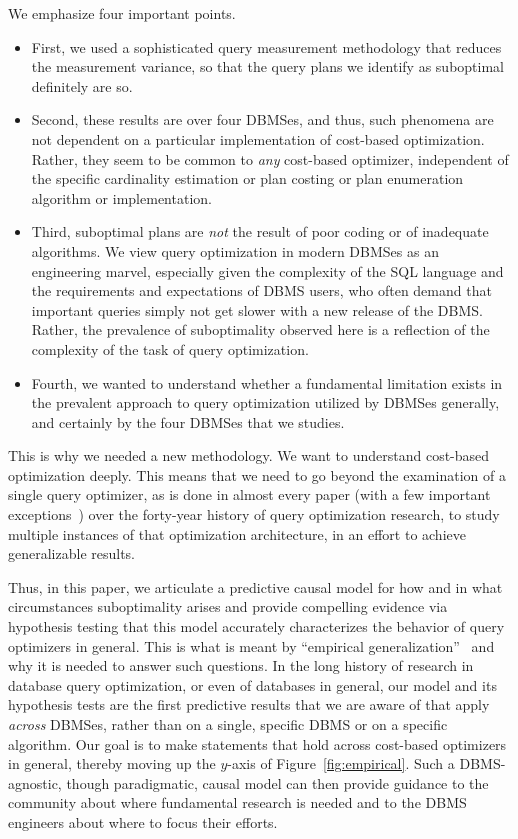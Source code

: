 \documentclass[prodmode,acmtods]{acmsmall}
\begin{document}
We emphasize four important points.
\begin{itemize}
\item First, we used a sophisticated query
measurement methodology that reduces the measurement variance, so that the
query plans we identify as suboptimal definitely are so.
\item Second, these
results are over four \hbox{DBMSes}, and thus, such phenomena are not dependent on
a particular implementation of cost-based optimization. Rather, they seem to
be common to {\em any} cost-based optimizer, independent of the specific
cardinality \hbox{estimation} or plan costing or plan enumeration algorithm or
implementation.
\item Third, suboptimal plans are {\em not} the result of poor
coding or of inadequate algorithms. We view query optimization in modern
\hbox{DBMSes} as an engineering marvel, especially given the complexity of the SQL
language and the requirements and expectations of \hbox{DBMS} users, who often
demand that important queries simply not get slower with a new release of
the \hbox{DBMS}. Rather, the prevalence of suboptimality observed here is a
reflection of the complexity of the task of query optimization.
\item Fourth, we wanted to understand whether a fundamental
limitation exists in the prevalent approach to query optimization utilized
by DBMSes generally, and certainly by the four DBMSes that we studies.
\end{itemize}

This is why we needed a new methodology. We want to understand cost-based
optimization deeply. This means that we need to go beyond the examination of
a single query optimizer, as is done in almost every paper (with a few
important exceptions~\cite{harish07,Haritsa10,Leis15}) over the forty-year history of
query optimization research, to study multiple instances of that
optimization architecture, in an effort to achieve generalizable results.

Thus, in this paper, we articulate a predictive causal model for how and in
what circumstances suboptimality arises and provide compelling evidence via
\hbox{hypothesis} testing that this model accurately characterizes the
\hbox{behavior} of query optimizers in general. This is what is meant by
``empirical generalization''~\cite{cohenbook} and why it is needed to answer
such questions. In the long history of research in database query
optimization, or even of databases in general, our model and its hypothesis
tests are the first predictive results that we are aware of that apply {\em
  across} \hbox{DBMSes}, rather than on a single, specific \hbox{DBMS} or on
a specific algorithm. Our goal is to make statements
that hold across cost-based optimizers in general, thereby moving up the
$y$-axis of Figure~\ref{fig:empirical}.
Such a DBMS-agnostic, though paradigmatic, causal
model can then \hbox{provide} guidance to the community about where fundamental
research is needed and to the \hbox{DBMS} engineers about where to focus
their efforts.
\end{document}
